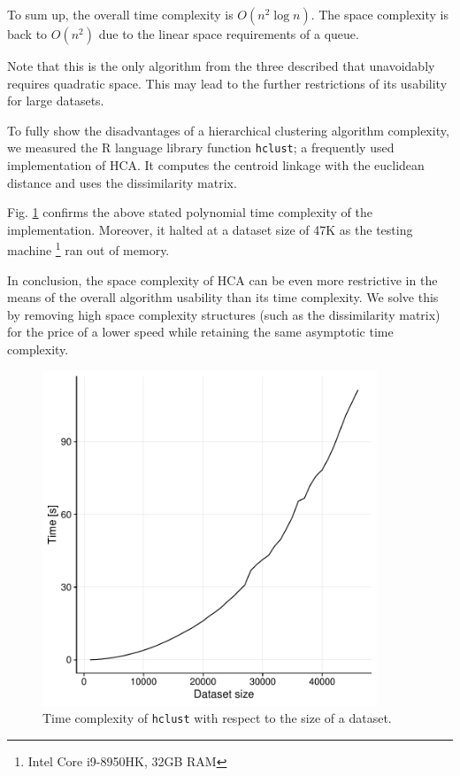 \begin{description}
 	To sum up, the overall time complexity is $O(n^2\log{n})$. The space complexity is back to $O(n^2)$ due to the linear space requirements of a queue.
 	
 	\begin{rem}
 		Note that this is the only algorithm from the three described that unavoidably requires quadratic space. This may lead to the further restrictions of its usability for large datasets.
 	\end{rem}

\end{description}

To fully show the disadvantages of a hierarchical clustering algorithm complexity, we measured the R language library function \texttt{hclust}; a frequently used implementation of HCA. It computes the centroid linkage with the euclidean distance and uses the dissimilarity matrix. 

Fig. \ref{fig01:hclust} confirms the above stated polynomial time complexity of the implementation. Moreover, it halted at a dataset size of 47K as the testing machine \footnote{Intel Core i9-8950HK, 32GB RAM} ran out of memory.

In conclusion, the space complexity of HCA can be even more restrictive in the means of the overall algorithm usability than its time complexity. We solve this by removing high space complexity structures (such as the dissimilarity matrix) for the price of a lower speed while retaining the same asymptotic time complexity.

\begin{figure}\centering
	\includegraphics[width=10cm]{img/hclust}
	\caption{Time complexity of \texttt{hclust} with respect to the size of a dataset.}
	\label{fig01:hclust}
\end{figure}
